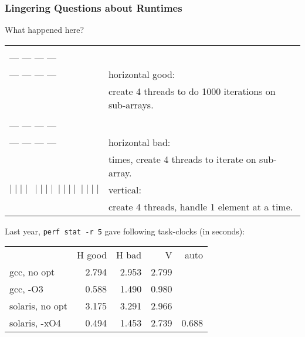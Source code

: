 \begin{frame}[containsverbatim]
  \frametitle{Lingering Questions about Runtimes}

  
    What happened here?\\[1em]
  
    \begin{tabular}{ll}
      \begin{minipage}{5em} --- --- --- ---\\[-.8em] --- --- --- ---\\[-.8em] --- --- --- --- \end{minipage}& horizontal good: \\
      & \qquad create 4 threads to do 1000 iterations on sub-arrays.\\
      \begin{minipage}{5em} --- --- --- ---\\[-.8em] --- --- --- ---\\[-.8em] --- --- --- --- \end{minipage}& horizontal bad: \\
      & \qquad 1000 times, create 4 threads to iterate on sub-array. \\
      $ \mid \mid \mid\mid \: \mid \mid \mid \mid \: \mid \mid \mid \mid\: \mid \mid \mid \mid$& vertical:\\
      & \qquad create 4 threads, handle 1 element at a time.\\[1em]
    \end{tabular}
    
      
      Last year, {\tt perf stat -r 5} gave following task-clocks (in seconds):\\[1em]

      \begin{center}
      \begin{tabular}{lrrrr}
        & H good & H bad & V & auto \\
        gcc, no opt & 2.794 & 2.953 & 2.799\\
        gcc, -O3 & 0.588 & 1.490 & 0.980\\
        solaris, no opt & 3.175 & 3.291 & 2.966 \\
        solaris, -xO4 & 0.494 & 1.453 & 2.739 & 0.688\\
      \end{tabular}
      \end{center}
  
\end{frame}

